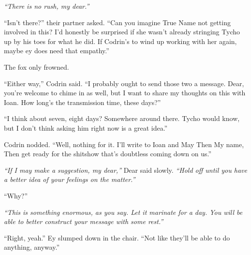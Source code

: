 \emph{``There is no rush, my dear.''}

``Isn't there?'' their partner asked. ``Can you imagine True Name not getting involved in this? I'd honestly be surprised if she wasn't already stringing Tycho up by his toes for what he did. If Codrin's to wind up working with her again, maybe ey does need that empathy.''

The fox only frowned.

``Either way,'' Codrin said. ``I probably ought to send those two a message. Dear, you're welcome to chime in as well, but I want to share my thoughts on this with Ioan. How long's the transmission time, these days?''

``I think about seven, eight days? Somewhere around there. Tycho would know, but I don't think asking him right now is a great idea.''

Codrin nodded. ``Well, nothing for it. I'll write to Ioan and May Then My name, Then get ready for the shitshow that's doubtless coming down on us.''

\emph{``If I may make a suggestion, my dear,''} Dear said slowly. \emph{``Hold off until you have a better idea of your feelings on the matter.''}

``Why?''

\emph{``This is something enormous, as you say. Let it marinate for a day. You will be able to better construct your message with some rest.''}

``Right, yeah.'' Ey slumped down in the chair. ``Not like they'll be able to do anything, anyway.''
